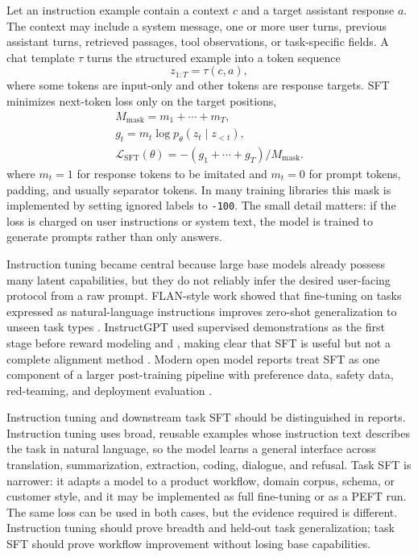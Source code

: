 Let an instruction example contain a context $c$ and a target assistant response $a$. The context may include a system message, one or more user turns, previous assistant turns, retrieved passages, tool observations, or task-specific fields. A chat template $\tau$ turns the structured example into a token sequence
\begin{equation}
  z_{1:T} = \tau(c, a),
\end{equation}
where some tokens are input-only and other tokens are response targets. SFT minimizes next-token loss only on the target positions,
\begin{equation}
  \begin{gathered}
  M_{\mathrm{mask}} = m_1+\cdots+m_T,\\
  g_t = m_t\log p_{\theta}(z_t \mid z_{<t}),\\
  \mathcal{L}_{\mathrm{SFT}}(\theta)=-(g_1+\cdots+g_T)/M_{\mathrm{mask}}.
  \end{gathered}
  \label{eq:sft-masked-loss}
\end{equation}
where $m_t=1$ for response tokens to be imitated and $m_t=0$ for prompt tokens, padding, and usually separator tokens. In many training libraries this mask is implemented by setting ignored labels to \texttt{-100}. The small detail matters: if the loss is charged on user instructions or system text, the model is trained to generate prompts rather than only answers.

Instruction tuning became central because large base models already possess many latent capabilities, but they do not reliably infer the desired user-facing protocol from a raw prompt. FLAN-style work showed that fine-tuning on tasks expressed as natural-language instructions improves zero-shot generalization to unseen task types \cite{wei2021finetuned}. InstructGPT used supervised demonstrations as the first stage before reward modeling and \rlhf, making clear that SFT is useful but not a complete alignment method \cite{ouyang2022training}. Modern open model reports treat SFT as one component of a larger post-training pipeline with preference data, safety data, red-teaming, and deployment evaluation \cite{touvron2023llama2,dubey2024llama3}.

Instruction tuning and downstream task SFT should be distinguished in reports. Instruction tuning uses broad, reusable examples whose instruction text describes the task in natural language, so the model learns a general interface across translation, summarization, extraction, coding, dialogue, and refusal. Task SFT is narrower: it adapts a model to a product workflow, domain corpus, schema, or customer style, and it may be implemented as full fine-tuning or as a PEFT run. The same loss can be used in both cases, but the evidence required is different. Instruction tuning should prove breadth and held-out task generalization; task SFT should prove workflow improvement without losing base capabilities.

